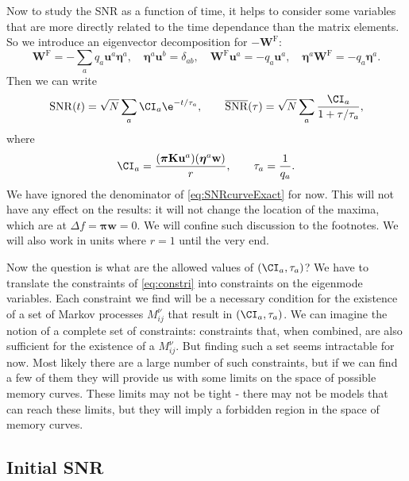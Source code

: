 \documentclass[12pt]{article}
\newcommand{\eqm}{\pi}
\newcommand{\eq}{\boldsymbol{\eqm}}
\newcommand{\wm}{w}
\newcommand{\w}{\mathbf{\wm}}
\newcommand{\Wm}{W}
\newcommand{\W}{\mathbf{\Wm}}
\newcommand{\MMdm}{M}
\newcommand{\encm}{K}
\newcommand{\enc}{\mathbf{\encm}}
\newcommand{\frg}{\W^{\mathrm{F}}}
\newcommand{\evrm}{u}
\newcommand{\evr}{\mathbf{\evrm}}
\newcommand{\evlm}{\eta}
\newcommand{\evl}{\boldsymbol{\evlm}}
\DeclareMathOperator{\snr}{SNR}
\newcommand{\snrb}{\overline{\snr}}
\begin{document}
Now to study the SNR as a function of  time, it helps to consider some variables that are more directly related to the time dependance than the matrix elements. 
So we introduce an eigenvector decomposition for \(-\frg\):
%
\begin{equation}\label{eq:eigendecomp}
  \frg = - \sum_a q_a \evr^a \evl^a,
  \quad
  \evl^a \evr^b = \delta_{ab},
  \quad
  \frg \evr^a = -q_a \evr^a,
  \quad
  \evl^a \frg = -q_a \evl^a.
\end{equation}
%
Then we can write
%
\begin{equation}\label{eq:snreig}
  \snr(t) = \sqrt{N}\sum_a \CI_a \e^{-t/\tau_a},
  \qquad
  \snrb(\tau) = \sqrt{N}\sum_a \frac{\CI_a}{1+\tau/\tau_a},
\end{equation}
%
where
%
\begin{equation}\label{eq:snrcoeffs}
  \CI_a = \frac{(\eq \enc \evr^a) (\evl^a \w)}{r},
  \qquad
  \tau_a = \frac{1}{q_a}.
\end{equation}
%
We have ignored the denominator of \cref{eq:SNRcurveExact} for now.
This will not have any effect on the results: it will not change the location of the maxima, which are at \( \Delta f = \eq \w = 0 \).
We will confine such discussion to the footnotes.
We will also work in units where \(r = 1\) until the very end.

Now the question is what are the allowed values of \( (\CI_a, \tau_a) \)?
We have to translate the constraints of \cref{eq:constri} into constraints on the eigenmode variables.
Each constraint we find will be a necessary condition for the existence of a set of Markov processes \( \MMdm_{ij}^\nu \) that result in \( (\CI_a, \tau_a) \).
We can imagine the notion of a complete set of constraints: constraints that, when combined, are also sufficient for the existence of a \( \MMdm_{ij}^\nu \).
But finding such a set seems intractable for now.
Most likely there are a large number of such constraints, but if we can find a few of them they will provide us with some limits on the space of possible memory curves.
These limits may not be tight - there may not be models that can reach these limits, but they will imply a forbidden region in the space of memory curves.



\subsection{Initial SNR}\label{sec:initial}
\end{document}
